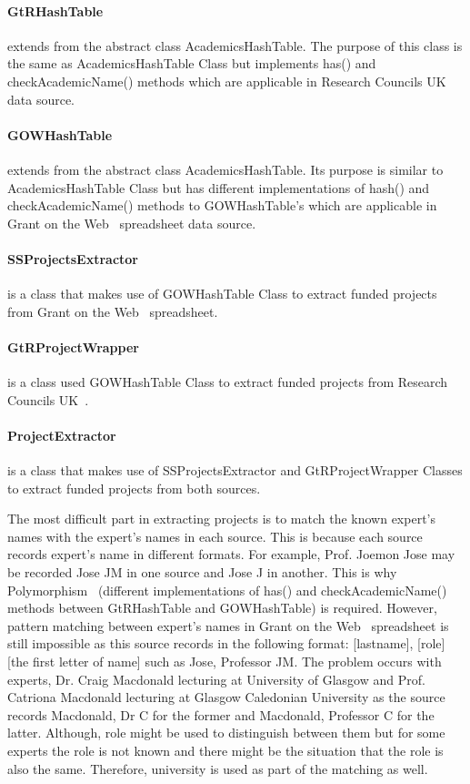 \paragraph{GtRHashTable} extends from the abstract class AcademicsHashTable. The purpose of this class is the same as AcademicsHashTable Class but
implements has() and checkAcademicName() methods which are applicable in Research Councils UK~\cite{gtr} data source.
\paragraph{GOWHashTable} extends from the abstract class AcademicsHashTable. Its purpose is similar to AcademicsHashTable Class but
has different implementations of hash() and checkAcademicName() methods to GOWHashTable's which are applicable in Grant on the Web~\cite{gow} spreadsheet data source.
\paragraph{SSProjectsExtractor} is a class that makes use of GOWHashTable Class to extract funded projects from Grant on the Web~\cite{gow} spreadsheet.
\paragraph{GtRProjectWrapper} is a class used GOWHashTable Class to extract funded projects from Research Councils UK~\cite{gtr}.
\paragraph{ProjectExtractor} is a class that makes use of SSProjectsExtractor and GtRProjectWrapper Classes to extract funded projects from both sources.

The most difficult part in extracting projects is to match the known expert's names with the expert's names in each source. This is because each source
records expert's name in different formats. For example, Prof. Joemon Jose may be recorded Jose JM in one source and Jose J in another. This is why Polymorphism~\cite{polymorphism} 
(different implementations of has() and checkAcademicName() methods between GtRHashTable and GOWHashTable) is required. However, pattern matching between
expert's names in Grant on the Web~\cite{gow} spreadsheet is still impossible as this source records in the following format: 
[lastname], [role] [the first letter of name] such as Jose, Professor JM. The problem occurs with experts, Dr. Craig Macdonald lecturing at
University of Glasgow and Prof. Catriona Macdonald lecturing at Glasgow Caledonian University
as the source records Macdonald, Dr C for the former and Macdonald, Professor C for the latter. Although, role might be used to distinguish between them but
for some experts the role is not known and there might be the situation that the role is also the same. 
Therefore, university is used as part of the matching as well.

